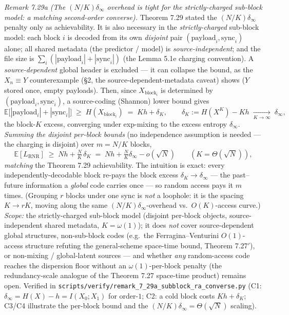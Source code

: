 \documentclass[
]{article}
\begin{document}
\emph{Remark 7.29a (The $(N/K)\delta_\infty$ overhead is tight for the
strictly-charged sub-block model: a matching second-order converse).} Theorem 7.29
stated the $(N/K)\delta_\infty$ penalty only as achievability. It is also necessary
in the \emph{strictly-charged} sub-block model: each block $i$ is decoded from its
own \emph{disjoint} pair $(\mathrm{payload}_i,\mathrm{sync}_i)$ alone; all shared
metadata (the predictor / model) is \emph{source-independent}; and the file size is
$\sum_i(|\mathrm{payload}_i|+|\mathrm{sync}_i|)$ (the Lemma 5.1e charging convention).
A \emph{source-dependent} global header is excluded --- it can collapse the bound, as
the $X_n\equiv Y$ counterexample (\S2, the source-dependent-metadata caveat) shows
($Y$ stored once, empty payloads). Then, since $X_{\mathrm{block}_i}$ is determined
by $(\mathrm{payload}_i,\mathrm{sync}_i)$, a source-coding (Shannon) lower bound gives
\[
\mathbb E\bigl[|\mathrm{payload}_i|+|\mathrm{sync}_i|\bigr]\;\ge\;
H(X_{\mathrm{block}_i})\;=\;Kh+\delta_K, \qquad
\delta_K:=H(X^K)-Kh\;\xrightarrow[K\to\infty]{}\;\delta_\infty,
\]
the block-$K$ excess, converging under exp-mixing to the excess entropy
$\delta_\infty$. \emph{Summing the disjoint per-block bounds} (no independence
assumption is needed --- the charging is disjoint) over $m=N/K$ blocks,
\[
\mathbb E[L_{\mathrm{RNR}}]\;\ge\; Nh + \tfrac{N}{K}\,\delta_K
\;=\; Nh+\tfrac{N}{K}\delta_\infty - o(\sqrt N) \qquad(K=\Theta(\sqrt N)),
\]
\emph{matching} the Theorem 7.29 achievability. The intuition is exact: every
independently-decodable block re-pays the block excess $\delta_K\to\delta_\infty$
--- the past--future information a \emph{global} code carries once --- so random
access pays it $m$ times. (Grouping $r$ blocks under one sync is \emph{not} a
loophole: it is the spacing $K\to rK$, moving along the same
$(N/K)\delta_\infty$-overhead vs.\ $O(K)$-access curve.) \emph{Scope:} the
strictly-charged sub-block model (disjoint per-block objects, source-independent
shared metadata, $K=\omega(1)$); it does \emph{not} cover source-dependent global
structures, non-sub-block codes (e.g.\ the Ferragina--Venturini $O(1)$-access
structure refuting the general-scheme space-time bound, Theorem 7.27$'$), or
non-mixing / global-latent sources --- and whether \emph{any} random-access code
reaches the dispersion floor without an $\omega(1)$-per-block penalty (the
redundancy-scale analogue of the Theorem 7.27 space-time product) remains open.
Verified in \texttt{scripts/verify/remark\_7\_29a\_subblock\_ra\_converse.py} (C1:
$\delta_\infty=H(X)-h=I(X_0;X_1)$ for order-$1$; C2: a cold block costs $Kh+\delta_K$;
C3/C4 illustrate the per-block bound and the $(N/K)\delta_\infty=\Theta(\sqrt N)$
scaling).
\end{document}
